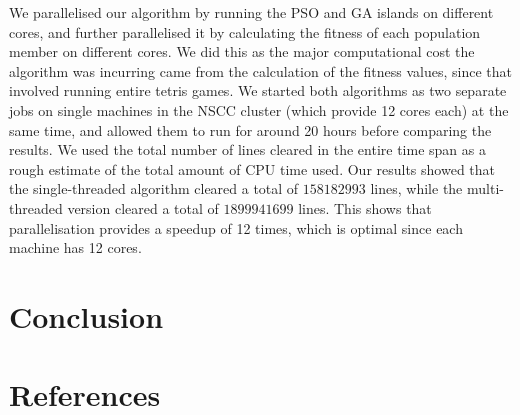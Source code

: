 \documentclass[12pt]{article}
\begin{document}
	We parallelised our algorithm by running the PSO and GA islands on different cores,
	and further parallelised it by calculating the fitness of each population member on different cores.
	We did this as the major computational cost the algorithm was incurring came from
	the calculation of the fitness values, since that involved running entire tetris games. We started both algorithms as two separate jobs on single machines
	in the NSCC cluster (which provide 12 cores each) at the same time, and allowed them to run for around 20
	hours before comparing the results. We used the total number of lines cleared
	in the entire time span as a rough estimate of the total amount of
	CPU time used. Our results showed that the single-threaded algorithm cleared
	a total of $158182993$ lines, while the multi-threaded version cleared a total
	of $1899941699$ lines. This shows that parallelisation provides a speedup of 12 times,
	which is optimal since each machine has 12 cores.

    \section{Conclusion}



    \section{References}
	
	
\end{document}
